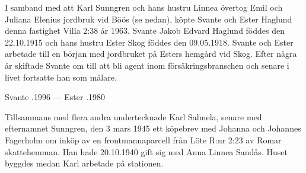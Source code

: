 %
I samband med att Karl Sunngren och hans hustru Linnea övertog Emil och Juliana Elenius jordbruk vid Böös (se nedan), köpte Svante och Ester Haglund denna fastighet Villa 2:38 år 1963. Svante Jakob Edvard Haglund föddes den 22.10.1915 och hans hustru Ester Skog föddes den 09.05.1918. Svante och Ester arbetade till en början med jordbruket på Esters hemgård vid Skog. Efter några år skiftade Svante om till att bli agent inom försäkringsbranschen och senare i livet fortsatte han som målare.
\begin{jhchildren}
  \item {}
  \item {}
  \item {}
  \item {}
  \item {}
\end{jhchildren}

Svante .1996  ---  Ester .1980


%
Tillsammans med flera andra undertecknade Karl Salmela, senare  med efternamnet Sunngren, den 3 mars 1945 ett köpebrev med Johanna och Johannes Fagerholm om inköp av en frontmannaparcell från Löte R:nr 2:23 av Romar skattehemman. Han hade 20.10.1940 gift sig med Anna Linnea Sandås. Huset byggdes medan Karl arbetade på stationen.
\begin{jhchildren}
  \item {}
  \item {}
  \item {}
  \item {}
  \item {}
\end{jhchildren}

